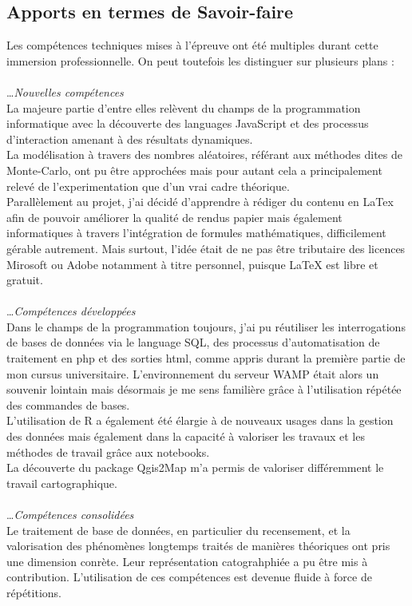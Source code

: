 \documentclass{bredele}
\begin{document}
\subsection{Apports en termes de Savoir-faire}
Les compétences techniques mises à l'épreuve ont été multiples durant cette immersion professionnelle. On peut toutefois les distinguer sur plusieurs plans :\\\\
\ldots\textit{Nouvelles compétences}\\
La majeure partie d'entre elles relèvent du champs de la programmation informatique avec la découverte des languages JavaScript et des processus d'interaction amenant à des résultats dynamiques.\\La modélisation à travers des nombres aléatoires, référant aux méthodes dites de Monte-Carlo, ont pu être approchées mais pour autant cela a principalement relevé de l'experimentation que d'un vrai cadre théorique.\\
Parallèlement au projet, j'ai décidé d'apprendre à rédiger du contenu en LaTex afin de pouvoir améliorer la qualité de rendus papier mais également informatiques à travers l'intégration de formules mathématiques, difficilement gérable autrement. Mais surtout, l'idée était de ne pas être tributaire des licences Mirosoft ou Adobe notamment à titre personnel, puisque LaTeX est libre et gratuit.\\\\
\ldots\textit{Compétences développées}\\
Dans le champs de la programmation toujours, j'ai pu réutiliser les interrogations de bases de données via le language SQL, des processus d'automatisation de traitement en php et des sorties html, comme appris durant la première partie de mon cursus universitaire. L'environnement du serveur WAMP était alors un souvenir lointain mais désormais je me sens familière grâce à l'utilisation répétée des commandes de bases.\\
L'utilisation de R a également été élargie à de nouveaux usages dans la gestion des données mais également dans la capacité à valoriser les travaux et les méthodes de travail grâce aux notebooks.\\La découverte du package Qgis2Map m'a permis de valoriser différemment le travail cartographique.\\\\
\ldots\textit{Compétences consolidées}\\
Le traitement de base de données, en particulier du recensement, et la valorisation des phénomènes longtemps traités de manières théoriques ont pris une dimension conrète. Leur représentation catograhphiée a pu être mis à contribution. L'utilisation de ces compétences est devenue fluide à force de répétitions.
\end{document}
